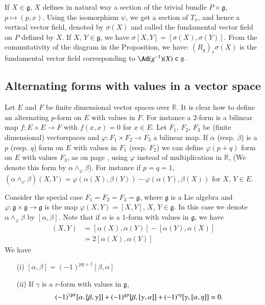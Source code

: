 \begin{remark}\label{sec11-rem11.2}
If $X\in \mathfrak{g}$, $X$ defines in natural way a section of the trivial bundle $P\times \mathfrak{g}$, $p\mapsto (p,x)$. Using the isomorphism $\psi$, we get a section of $T_{\pi}$, and hence a vertical vector field, denoted by $\sigma(X)$ and called the fundamental vector field on $P$ defined by $X$. If $X$, $Y\in \mathfrak{g}$, we have $\sigma[X,Y]=[\sigma(X),\sigma(Y)]$. From the commutativity of the diagram in the Proposition, we have: $(R_{g})_{*}\sigma(X)$ is the fundamental vector field corresponding to $\Ad(g^{-1})(X)\in \mathfrak{g}$.
\end{remark}

\subsection*{Alternating forms with values in a vector space}

Let $E$ and $F$ be finite dimensional vector spaces over $\mathbb{R}$. It is clear how to define an alternating $p$-form on $E$ with values in $F$. For instance a $2$-form is a bilinear map $f:E\times E\to F$ with $f(x,x)=0$ for $x\in E$. Let $F_{1}$, $F_{2}$, $F_{3}$ be (finite dimensional) vector\pageoriginale spaces and $\varphi:F_{1}\times F_{2}\to F_{3}$ a bilinear map. If $\alpha$ (resp. $\beta$) is a $p$ (resp. $q$) form on $E$ with values in $F_{1}$ (resp. $F_{2}$) we can define $\varphi(p+q)$ form on $E$ with values $F_{3}$, as on page \pageref{page13}, using $\varphi$ instead of multiplication in $\mathbb{R}$, (We denote this form by $\alpha\wedge_{\varphi}\beta$). For instance if $p=q=1$, $(\alpha\wedge_{\varphi}\beta)(X,Y)=\varphi(\alpha(X),\beta(Y))-\varphi(\alpha(Y),\beta(X))$ for $X$, $Y\in E$.

Consider the special case $F_{1}=F_{2}=F_{3}=\mathfrak{g}$, where $\mathfrak{g}$ is a Lie algebra and $\varphi:\mathfrak{g}\times \mathfrak{g}\to \mathfrak{g}$ is the map $\varphi(X,Y)=[X,Y]$, $X$, $Y\in \mathfrak{g}$. In this case we denote $\alpha\wedge_{\varphi}\beta$ by $[\alpha,\beta]$. Note that if $\alpha$ is a $1$-form with values in $\mathfrak{g}$, we have
\begin{align*}
[\alpha,\alpha](X,Y) &= [\alpha(X),\alpha(Y)]-[\alpha(Y),\alpha(X)]\\[3pt]
                     &= 2[\alpha(X),\alpha(Y)]
\end{align*}
We have 
\begin{itemize}
\item[(i)] $[\alpha,\beta]=(-1)^{pq+1}[\beta,\alpha]$\label{page50}

\item[(ii)] If $\gamma$ is a $r$-form with values in $\mathfrak{g}$,
$$
(-1)^{\pr}[\alpha,[\beta,\gamma]]+(-1)^{qp}[\beta,[\gamma,\alpha]]+(-1)^{rq}[\gamma,[\alpha,\eta]]=0.
$$
\end{itemize}

